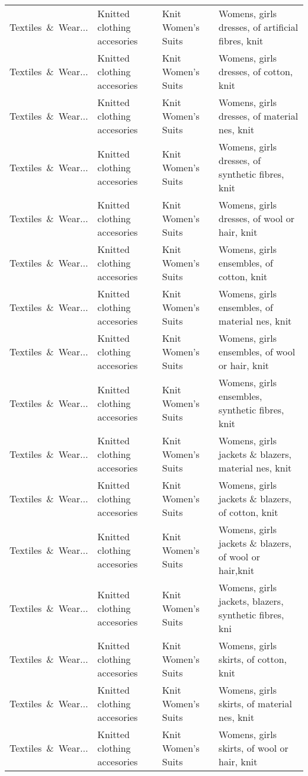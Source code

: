 \begin{appendices}
\begin{xltabular}{\textwidth}{|p{0.10\textwidth}|p{0.25\textwidth}|p{0.24\textwidth}|p{0.31\textwidth}|}
Textiles\ \&\ Wear... & Knitted clothing accesories & Knit Women's Suits & Womens, girls dresses, of artificial fibres, knit \\
Textiles\ \&\ Wear... & Knitted clothing accesories & Knit Women's Suits & Womens, girls dresses, of cotton, knit \\
Textiles\ \&\ Wear... & Knitted clothing accesories & Knit Women's Suits & Womens, girls dresses, of material nes, knit \\
Textiles\ \&\ Wear... & Knitted clothing accesories & Knit Women's Suits & Womens, girls dresses, of synthetic fibres, knit \\
Textiles\ \&\ Wear... & Knitted clothing accesories & Knit Women's Suits & Womens, girls dresses, of wool or hair, knit \\
Textiles\ \&\ Wear... & Knitted clothing accesories & Knit Women's Suits & Womens, girls ensembles, of cotton, knit \\
Textiles\ \&\ Wear... & Knitted clothing accesories & Knit Women's Suits & Womens, girls ensembles, of material nes, knit \\
Textiles\ \&\ Wear... & Knitted clothing accesories & Knit Women's Suits & Womens, girls ensembles, of wool or hair, knit \\
Textiles\ \&\ Wear... & Knitted clothing accesories & Knit Women's Suits & Womens, girls ensembles, synthetic fibres, knit \\
Textiles\ \&\ Wear... & Knitted clothing accesories & Knit Women's Suits & Womens, girls jackets \& blazers, material nes, knit \\
Textiles\ \&\ Wear... & Knitted clothing accesories & Knit Women's Suits & Womens, girls jackets \& blazers, of cotton, knit \\
Textiles\ \&\ Wear... & Knitted clothing accesories & Knit Women's Suits & Womens, girls jackets \& blazers, of wool or hair,knit \\
Textiles\ \&\ Wear... & Knitted clothing accesories & Knit Women's Suits & Womens, girls jackets, blazers, synthetic fibres, kni \\
Textiles\ \&\ Wear... & Knitted clothing accesories & Knit Women's Suits & Womens, girls skirts, of cotton, knit \\
Textiles\ \&\ Wear... & Knitted clothing accesories & Knit Women's Suits & Womens, girls skirts, of material nes, knit \\
Textiles\ \&\ Wear... & Knitted clothing accesories & Knit Women's Suits & Womens, girls skirts, of wool or hair, knit \\

\end{xltabular}
\end{appendices}

